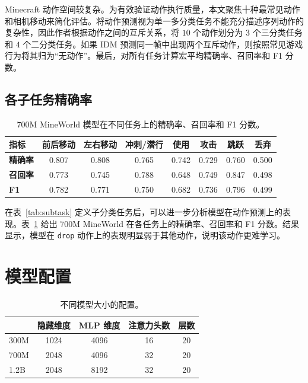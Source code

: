 \documentclass{article} %
\begin{document}
Minecraft 动作空间较复杂。为有效验证动作执行质量，本文聚焦十种最常见动作和相机移动来简化评估。将动作预测视为单一多分类任务不能充分描述序列动作的复杂性，因此作者根据动作之间的互斥关系，将 $10$ 个动作划分为 $3$ 个三分类任务和 $4$ 个二分类任务。如果 IDM 预测同一帧中出现两个互斥动作，则按照常见游戏行为将其归为“无动作”。最后，对所有任务计算宏平均精确率、召回率和 F1 分数。



\subsection{各子任务精确率}

\begin{table}[htbp]
\centering
\caption{$700$M MineWorld 模型在不同任务上的精确率、召回率和 F1 分数。}
\begin{tabular}{ l|c|c|c|c|c|c|c }
\toprule[1pt]
\textbf{指标} & \textbf{前后移动} & \textbf{左右移动} & \textbf{冲刺/潜行} & \textbf{使用} & \textbf{攻击} & \textbf{跳跃} & \textbf{丢弃} \\
\midrule
\textbf{精确率} & 0.807 & 0.808 & 0.765 & 0.742 & 0.729 & 0.760 & 0.500 \\
\textbf{召回率} & 0.773 & 0.745 & 0.788 & 0.648 & 0.749 & 0.847 & 0.498 \\
\textbf{F1} & 0.782 & 0.771 & 0.750 & 0.682 & 0.736 & 0.796 & 0.499 \\
\bottomrule
\end{tabular}
\label{tab:specific_prf}
\end{table}

在表~\ref{tab:subtask} 定义子分类任务后，可以进一步分析模型在动作预测上的表现。表~\ref{tab:specific_prf} 给出 $700$M MineWorld 在各任务上的精确率、召回率和 F1 分数。结果显示，模型在 \texttt{drop} 动作上的表现明显弱于其他动作，说明该动作更难学习。

\section{模型配置}
\label{app:model_config}

\begin{table}[htbp]
    \centering
    \caption{不同模型大小的配置。}
    \begin{tabular}{l|c|c|c|c}
        \toprule[1pt]
            & \textbf{隐藏维度} & \textbf{MLP 维度} & \textbf{注意力头数} & \textbf{层数} \\
        \midrule
        300M &  1024 & 4096 & 16 & 20  \\
        700M &  2048 & 4096 & 32 & 20 \\
        1.2B &  2048 & 8192 & 32 & 20 \\
        \bottomrule[1pt]
    \end{tabular}
    \label{tab:model_arch}
\end{table}
\end{document}
